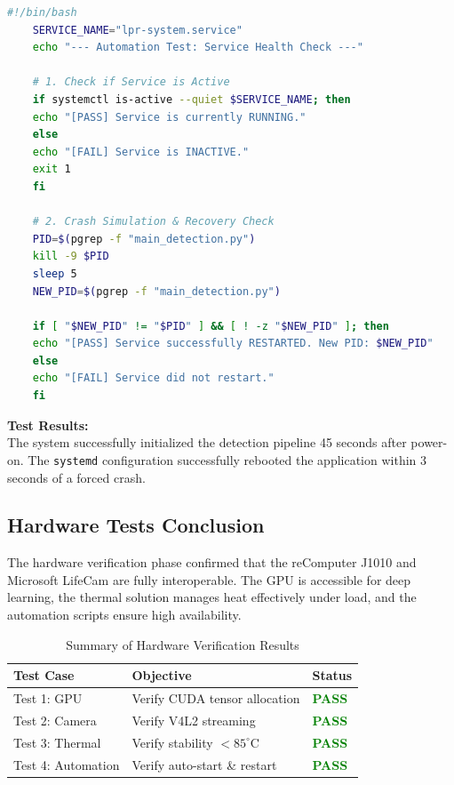 \begin{lstlisting}[language=bash, caption={Automation Verification Script}, label={lst:auto_test}]
	#!/bin/bash
	SERVICE_NAME="lpr-system.service"
	echo "--- Automation Test: Service Health Check ---"
	
	# 1. Check if Service is Active
	if systemctl is-active --quiet $SERVICE_NAME; then
	echo "[PASS] Service is currently RUNNING."
	else
	echo "[FAIL] Service is INACTIVE."
	exit 1
	fi
	
	# 2. Crash Simulation & Recovery Check
	PID=$(pgrep -f "main_detection.py")
	kill -9 $PID
	sleep 5
	NEW_PID=$(pgrep -f "main_detection.py")
	
	if [ "$NEW_PID" != "$PID" ] && [ ! -z "$NEW_PID" ]; then
	echo "[PASS] Service successfully RESTARTED. New PID: $NEW_PID"
	else
	echo "[FAIL] Service did not restart."
	fi
\end{lstlisting}

\textbf{Test Results:} \\
The system successfully initialized the detection pipeline 45 seconds after power-on. The \texttt{systemd} configuration successfully rebooted the application within 3 seconds of a forced crash.

\subsection{Hardware Tests Conclusion}

The hardware verification phase confirmed that the reComputer J1010 and Microsoft LifeCam are fully interoperable. The GPU is accessible for deep learning, the thermal solution manages heat effectively under load, and the automation scripts ensure high availability.

\begin{table}[h]
	\centering
	\caption{Summary of Hardware Verification Results}
	\label{tab:test_summary}
	\begin{tabular}{|l|l|l|}
		\hline
		\textbf{Test Case} & \textbf{Objective} & \textbf{Status} \\ \hline
		Test 1: GPU & Verify CUDA tensor allocation & \textcolor{green}{\textbf{PASS}} \\ \hline
		Test 2: Camera & Verify V4L2 streaming & \textcolor{green}{\textbf{PASS}} \\ \hline
		Test 3: Thermal & Verify stability $< 85^\circ$C & \textcolor{green}{\textbf{PASS}} \\ \hline
		Test 4: Automation & Verify auto-start \& restart & \textcolor{green}{\textbf{PASS}} \\ \hline
	\end{tabular}
\end{table}